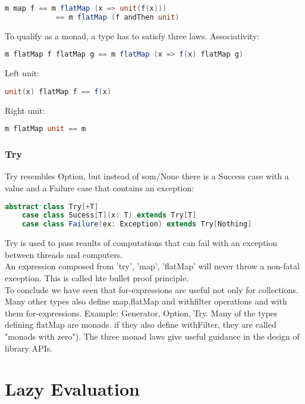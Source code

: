 \documentclass[10pt, a4paper]{report}
\begin{document}
\begin{lstlisting}[language=scala]
	m map f == m flatMap (x => unit(f(x)))
			== m flatMap (f andThen unit)
\end{lstlisting}

To qualify as a monad, a type has to satisfy three laws. Associativity:
\begin{lstlisting}[language=scala]
	m flatMap f flatMap g == m flatMap (x => f(x) flatMap g)
\end{lstlisting}

Left unit:
\begin{lstlisting}[language=scala]
	unit(x) flatMap f == f(x)
\end{lstlisting}

Right unit:
\begin{lstlisting}[language=scala]
	m flatMap unit == m
\end{lstlisting}

\subsection{Try}

Try resembles Option, but instead of som/None there is a Success case with a value and a Failure case that contains an exception:

\begin{lstlisting}[language=scala]
	abstract class Try[+T]
	case class Sucess[T](x: T) extends Try[T]
	case class Failure(ex: Exception) extends Try[Nothing]
\end{lstlisting}

Try is used to pass reaults of computations that can fail with an exception between threads and computers.\\

An expression composed from 'try', 'map', 'flatMap' will never throw a non-fatal exception. This is called hte bullet proof principle.\\

To conclude we have seen that for-expressions are useful not only for collections. Many other types also define map,flatMap and withfilter operations and with them for-expressions. Example: Generator, Option, Try. Many of the types defining flatMap are monads. if they also define withFilter, they are called "monads with zero"). The three monad laws give useful guidance in the design of library APIs.


\chapter{Lazy Evaluation}
\end{document}
